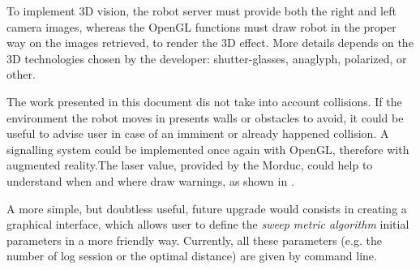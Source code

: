%
To implement 3D vision, the robot server must provide both the right and left camera images,
whereas the OpenGL functions must draw robot in the proper way on the images retrieved, to render
the 3D effect. More details depends on the 3D technologies chosen by the developer: shutter-glasses,
anaglyph, polarized, or other.
%

%
The work presented in this document dis not take into account 
collisions. If the environment the robot moves in presents walls 
or obstacles to avoid, it could be useful to advise user in case 
of an imminent or already happened collision.
%
A signalling system could be implemented once again with OpenGL, therefore 
with augmented reality.The laser value, provided by the Morduc,
could help to understand when and where draw warnings, as shown in 
\cite{morduc:macalusodetommaso}.
%

%
A more simple, but doubtless useful, future upgrade would consists in 
creating a graphical interface, which allows user to define the
\textit{sweep metric algorithm} initial parameters in a more friendly way. 
%
Currently, all these parameters (e.g. the number of log session or the 
optimal distance) are given by command line.

